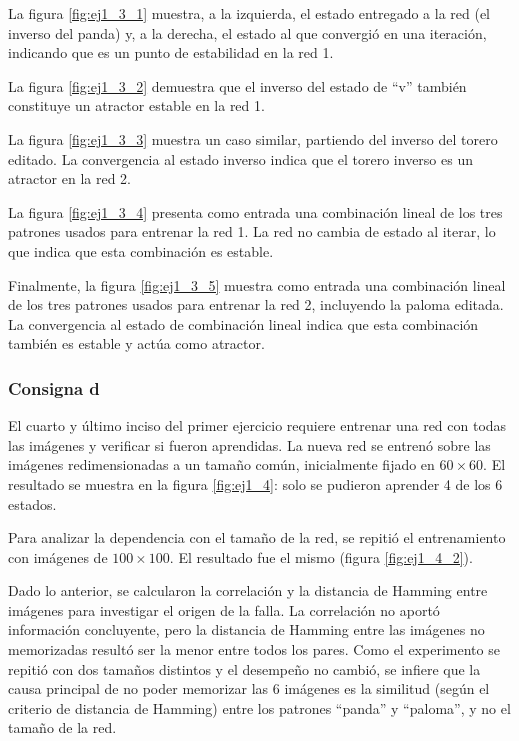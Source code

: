 \documentclass[11pt]{article} %
\begin{document}
La figura \ref{fig:ej1_3_1} muestra, a la izquierda, el estado entregado a la red (el inverso del panda) y, a la derecha, el estado al que convergió en una iteración, indicando que es un punto de estabilidad en la red 1.  

La figura \ref{fig:ej1_3_2} demuestra que el inverso del estado de ``v'' también constituye un atractor estable en la red 1.  

La figura \ref{fig:ej1_3_3} muestra un caso similar, partiendo del inverso del torero editado. La convergencia al estado inverso indica que el torero inverso es un atractor en la red 2.  

La figura \ref{fig:ej1_3_4} presenta como entrada una combinación lineal de los tres patrones usados para entrenar la red 1. La red no cambia de estado al iterar, lo que indica que esta combinación es estable.  

Finalmente, la figura \ref{fig:ej1_3_5} muestra como entrada una combinación lineal de los tres patrones usados para entrenar la red 2, incluyendo la paloma editada. La convergencia al estado de combinación lineal indica que esta combinación también es estable y actúa como atractor.



\subsubsection{Consigna d}
El cuarto y último inciso del primer ejercicio requiere entrenar una red con todas las imágenes y verificar si fueron aprendidas. La nueva red se entrenó sobre las imágenes redimensionadas a un tamaño común, inicialmente fijado en $60 \times 60$. El resultado se muestra en la figura \ref{fig:ej1_4}: solo se pudieron aprender 4 de los 6 estados.

Para analizar la dependencia con el tamaño de la red, se repitió el entrenamiento con imágenes de $100 \times 100$. El resultado fue el mismo (figura \ref{fig:ej1_4_2}).

Dado lo anterior, se calcularon la correlación y la distancia de Hamming entre imágenes para investigar el origen de la falla. La correlación no aportó información concluyente, pero la distancia de Hamming entre las imágenes no memorizadas resultó ser la menor entre todos los pares. Como el experimento se repitió con dos tamaños distintos y el desempeño no cambió, se infiere que la causa principal de no poder memorizar las 6 imágenes es la similitud (según el criterio de distancia de Hamming) entre los patrones ``panda'' y ``paloma'', y no el tamaño de la red.
\end{document}
